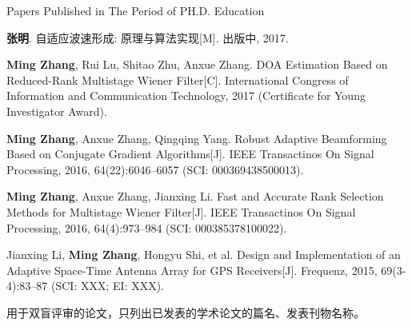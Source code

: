 
{} {Papers Published in The Period of PH.D. Education}

\begin{publist}
\item \textbf{\hei 张明}. 自适应波速形成: 原理与算法实现[M]. 出版中, 2017. 
%
\item \textbf{Ming Zhang}, Rui Lu, Shitao Zhu, Anxue Zhang. DOA Estimation Based on 
Reduced-Rank Multistage Wiener Filter[C]. International Congress of Information and 
Communication Technology, 2017 (Certificate for Young Investigator Award).
%
\item \textbf{Ming Zhang}, Anxue Zhang, Qingqing Yang. Robust Adaptive Beamforming Based on Conjugate Gradient Algorithms[J]. IEEE Transactinos On Signal Processing, 2016, 64(22):6046--6057 (SCI: 000369438500013).
%
\item \textbf{Ming Zhang}, Anxue Zhang, Jianxing Li. Fast and Accurate Rank Selection Methods for Multistage Wiener Filter[J]. IEEE Transactinos On Signal Processing, 2016, 64(4):973--984 (SCI: 000385378100022).
%
\item Jianxing Li, \textbf{Ming Zhang}, Hongyu Shi, et al. Design and Implementation of an Adaptive Space-Time Antenna Array for GPS Receivers[J]. Frequenz, 2015, 69(3-4):83--87 (SCI: XXX; EI: XXX).
\end{publist}

\vspace{4em}
{\color{red} 用于双盲评审的论文，只列出已发表的学术论文的篇名、发表刊物名称。}

\clearpage{\pagestyle{empty}\cleardoublepage}
